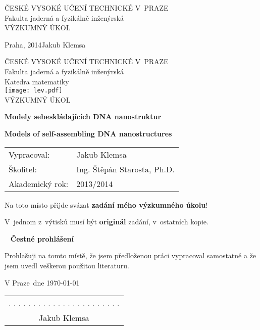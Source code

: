 \documentclass[a4paper, 11pt]{report}
\theoremstyle{definition}
\theoremstyle{remark}
\newcommand{\cvut}{ČESKÉ VYSOKÉ UČENÍ TECHNICKÉ V~PRAZE}
\newcommand{\fjfi}{Fakulta jaderná a fyzikálně inženýrská}
\newcommand{\km}{Katedra matematiky}
\newcommand{\TYPPRACE}{VÝZKUMNÝ ÚKOL}
\newcommand{\mePrace}{mého výzkumného úkolu}
\newcommand{\nazevcz}{Modely sebeskládajících DNA nanostruktur}
\newcommand{\nazeven}{Models of self-assembling DNA nanostructures}
\newcommand{\autor}{Jakub Klemsa}
\newcommand{\vedouci}{Ing. Štěpán Starosta, Ph.D.}
\newcommand{\rok}{2014}
\newcommand{\akadRok}{2013/2014}
\newcommand{\misto}{Praha}
\newcommand{\vMiste}{Praze}
\begin{document}
\begin{titlepage}

\thispagestyle{empty}
\begin{center}
	{\Large \cvut \\[12pt] \fjfi \\[260pt]}
	{\Huge \TYPPRACE}
\end{center}
\vfill
{
	\Large \misto, \rok \hfill \autor
}
\newpage


\thispagestyle{empty}
\begin{center}
	{\Large \cvut \\[10pt] \fjfi \\[10pt] \km \\[40pt]}
	\texttt{[image: lev.pdf]} \\[100pt]
	
	{\LARGE \TYPPRACE \\[60pt]}
	
	{\Large\bf \nazevcz \\[30pt]}
	
	{\Large\bf \nazeven}
\end{center}
\vfill
{
	\Large
	\begin{tabular}{ll}
	Vypracoval: & \autor\\[3pt]
	Školitel: & \vedouci\\[3pt]
	Akademický rok: & \akadRok
	\end{tabular}
}
\newpage


\thispagestyle{empty}
\Large
Na toto místo přijde svázat \textbf{zadání \mePrace}!

\vspace{4mm}
V~jednom z~výtisků musí být \textbf{originál} zadání, v~ostatních kopie.
\normalsize
\newpage


\thispagestyle{empty}
~
\vfill
\noindent\textbf{Čestné prohlášení}
\vspace{0.5cm}

\noindent
Prohlašuji na tomto místě, že jsem předloženou práci vypracoval samostatně a že jsem uvedl veškerou použitou literaturu.
\vspace{1.5cm}

\noindent
\vspace{5mm}V \vMiste ~dne \today\hfill
	\begin{tabular}{c}
	. . . . . . . . . . . . . . . . . . . . . . .\\
	\autor
	\end{tabular}
\newpage



\end{titlepage}
\end{document}
